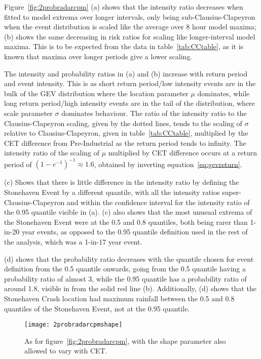 Figure~\ref{fig:2probradarcpm} (a) shows that the intensity ratio decreases when fitted to model extrema over longer intervals,
    only being sub-Clausius-Clapeyron when the event distribution is scaled like the average over 8 hour model maxima;
(b) shows the same decreasing in risk ratios for scaling like longer-interval model maxima.
This is to be expected from the data in table~\ref{tab:CCtable},
    as it is known that maxima over longer periods give a lower scaling.

The intensity and probability ratios in (a) and (b) increase with return period and event intensity.
This is as short return period/low intensity events are in the bulk of the GEV distribution
    where the location parameter $\mu$ dominates, while long return period/high intensity events are in the tail of
    the distribution, where scale parameter $\sigma$ dominates behaviour.
The ratio of the intensity ratio to the Clausius-Clapeyron scaling, given by the dotted lines,
    tends to the scaling of $\sigma$ relative to Clausius-Clapeyron,
    given in table~\ref{tab:CCtable}, multiplied by the CET difference from Pre-Industrial as the return period tends to infinity.
The intensity ratio of the scaling of $\mu$ multiplied by CET difference occurs at a return period of
    $\left( 1- e^{-1} \right)^{-1} \approx 1.6$, obtained by inverting equation~\ref{eq:gevreturn}.

(c) Shows that there is little difference in the intensity ratio by defining the Stonehaven Event by a different
    quantile, with all the intensity ratios super-Clausius-Clapeyron and within the confidence interval
    for the intensity ratio of the 0.95 quantile visible in (a).
(c) also shows that the most unusual extrema of the Stonehaven Event were at the 0.5 and 0.8 quantiles,
    both being rarer than 1-in-20 year events, as opposed to the 0.95 quantile definition used in the
    rest of the analysis, which was a 1-in-17 year event.

(d) shows that the probability ratio decreases with the quantile chosen for event definition from the 0.5 quantile onwards,
    going from the 0.5 quantile having a probability ratio of almost 3,
    while the 0.95 quantile has a probability ratio of around 1.8, visible in from the solid red line (b).
Additionally, (d) shows that the Stonehaven Crash location had maximum rainfall between the 0.5 and 0.8 quantiles of the Stonehaven Event,
    not at the 0.95 quantile.

\begin{figure}[H]
    \centering
    \texttt{[image: 2probradarcpmshape]}
    \caption[Figure~\ref{fig:2probradarcpm} with a covariate fit shape.]{
        As for figure~\ref{fig:2probradarcpm},
    with the shape parameter also allowed to vary with CET.}
    \label{fig:2probradarcpmshape}
\end{figure}

